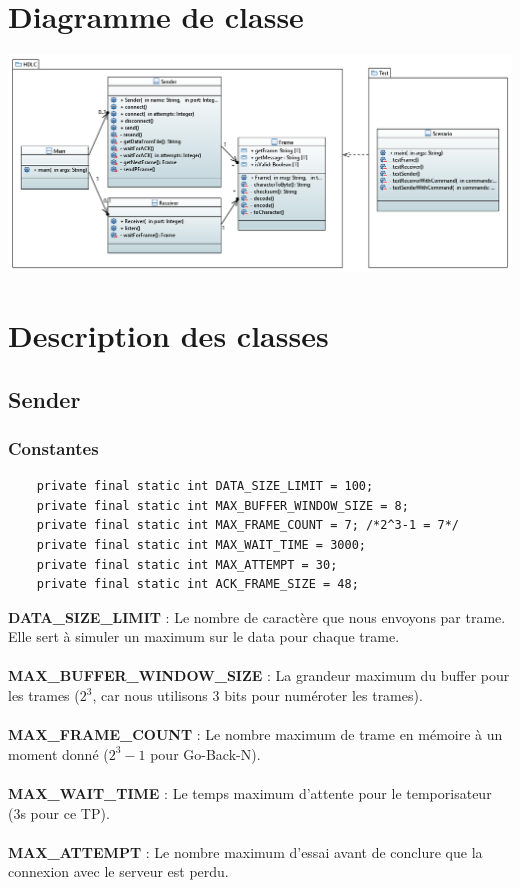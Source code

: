 \documentclass[a4paper,12pt]{article}
\begin{document}
	\begin{spacing}{1}
	\section*{Diagramme de classe}
	\includegraphics[scale=0.4]{ClassDiagram.png}
	\section*{Description des classes}
	\subsection*{Sender}
	\subsubsection*{Constantes}
	\begin{lstlisting}
	private final static int DATA_SIZE_LIMIT = 100; 
	private final static int MAX_BUFFER_WINDOW_SIZE = 8;
	private final static int MAX_FRAME_COUNT = 7; /*2^3-1 = 7*/
	private final static int MAX_WAIT_TIME = 3000;
	private final static int MAX_ATTEMPT = 30;
	private final static int ACK_FRAME_SIZE = 48;
	\end{lstlisting}
	\textbf{DATA\_SIZE\_LIMIT} : Le nombre de caractère que nous envoyons par trame. Elle sert à simuler un maximum sur le data pour chaque trame.\\\\
	\textbf{MAX\_BUFFER\_WINDOW\_SIZE} : La grandeur maximum du buffer pour les trames ($2^3$, car nous utilisons 3 bits pour numéroter les trames). \\\\
	\textbf{MAX\_FRAME\_COUNT} : Le nombre maximum de trame en mémoire à un moment donné ($2^3-1$ pour Go-Back-N).\\\\
	\textbf{MAX\_WAIT\_TIME} : Le temps maximum d'attente pour le temporisateur (3s pour ce TP).\\\\
	\textbf{MAX\_ATTEMPT} : Le nombre maximum d'essai avant de conclure que la connexion avec le serveur est perdu.

\end{spacing}
\end{document}
